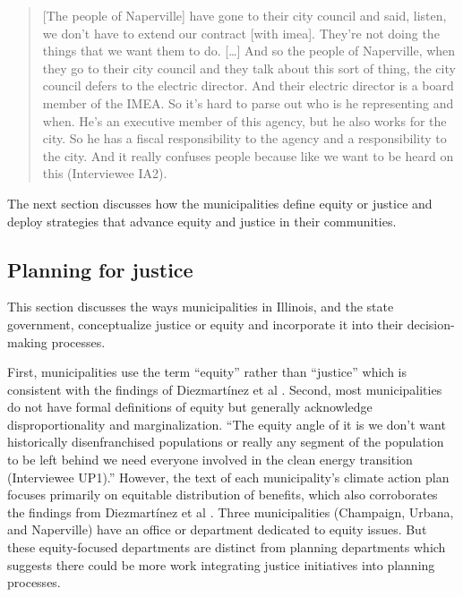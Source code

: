 \begin{quote}
    [The people of Naperville] have gone to their city council and said, listen,
    we don't have to extend our contract [with \ac{imea}]. They're not doing the
    things that we want them to do. [\dots] And so the people of Naperville,
    when they go to their city council and they talk about this sort of thing,
    the city council defers to the electric director. And their electric
    director is a board member of the IMEA. So it's hard to parse out who is he
    representing and when. He's an executive member of this agency, but he also
    works for the city. So he has a fiscal responsibility to the agency and a
    responsibility to the city. And it really confuses people because like we
    want to be heard on this (Interviewee IA2).
\end{quote}

The next section discusses how the municipalities define equity or justice and
deploy strategies that advance equity and justice in their communities.

\subsection{Planning for justice}
\label{section:muni-justice}

This section discusses the ways municipalities in Illinois, and the state
government, conceptualize justice or equity and incorporate it into their
decision-making processes.

First, municipalities use the term ``equity'' rather than ``justice'' which is
consistent with the findings of Diezmart\'inez et al
\cite{diezmartinez_us_2022}.  Second, most municipalities do not have formal
definitions of equity but generally acknowledge disproportionality and
marginalization. ``The equity angle of it is we don't want historically
disenfranchised populations or really any segment of the population to be left
behind we need everyone involved in the clean energy transition (Interviewee
UP1).'' However, the text of each municipality's climate action plan focuses
primarily on equitable distribution of benefits, which also corroborates the
findings from Diezmart\'inez et al \cite{diezmartinez_us_2022}. Three
municipalities (Champaign, Urbana, and Naperville) have an office or department
dedicated to equity issues. But these equity-focused departments are distinct
from planning departments which suggests there could be more work integrating
justice initiatives into planning processes.

